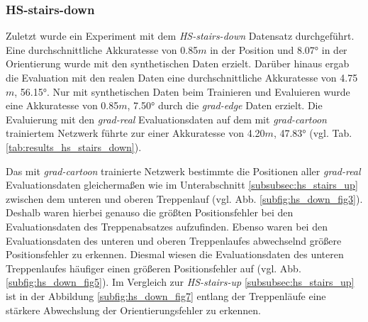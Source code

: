 \subsubsection{HS-stairs-down}
\label{subsubsec:hs_stairs_down}



Zuletzt wurde ein Experiment mit dem \textit{HS-stairs-down} Datensatz durchgeführt. Eine durchschnittliche Akkuratesse von 0.85$m$ in der Position und 8.07° in der Orientierung wurde mit den synthetischen Daten erzielt. Darüber hinaus ergab die Evaluation mit den realen Daten eine durchschnittliche Akkuratesse von 4.75$m$, 56.15°. Nur mit synthetischen Daten beim Trainieren und Evaluieren wurde eine Akkuratesse von 0.85$m$, 7.50° durch die \textit{grad-edge} Daten erzielt. Die Evaluierung mit den \textit{grad-real} Evaluationsdaten auf dem mit \textit{grad-cartoon} trainiertem Netzwerk führte zur einer Akkuratesse von 4.20$m$, 47.83° (vgl. Tab. \ref{tab:results_hs_stairs_down}). 

Das mit \textit{grad-cartoon} trainierte Netzwerk bestimmte die Positionen aller \textit{grad-real} Evaluationsdaten gleichermaßen wie im Unterabschnitt \ref{subsubsec:hs_stairs_up} zwischen dem unteren und oberen Treppenlauf (vgl. Abb. \ref{subfig:hs_down_fig3}). Deshalb waren hierbei genauso die größten Positionsfehler bei den Evaluationsdaten des Treppenabsatzes aufzufinden. Ebenso waren bei den Evaluationsdaten des unteren und oberen Treppenlaufes abwechselnd größere Positionsfehler zu erkennen. Diesmal wiesen die Evaluationsdaten des unteren Treppenlaufes häufiger einen größeren Positionsfehler auf (vgl. Abb. \ref{subfig:hs_down_fig5}). Im Vergleich zur \textit{HS-stairs-up} \ref{subsubsec:hs_stairs_up} ist in der Abbildung \ref{subfig:hs_down_fig7} entlang der Treppenläufe eine stärkere Abwechslung der Orientierungsfehler zu erkennen.

